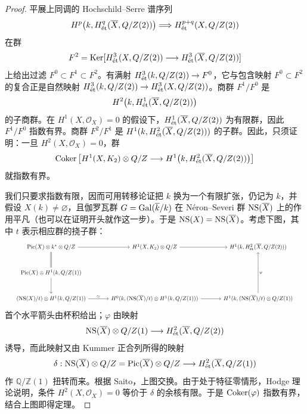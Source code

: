 \begin{proof}
平展上同调的 Hochschild--Serre 谱序列
\[
 H^p\bigl(k,H^q_{\mathrm{\acute et}}(\overline X,Q/Z(2))\bigr)
 \Longrightarrow H^{p+q}_{\mathrm{\acute et}}(X,Q/Z(2))
\]
在群
\[
 F^2=\operatorname{Ker}[H^3_{\mathrm{\acute et}}(X,Q/Z(2))
 \longrightarrow H^3_{\mathrm{\acute et}}(\overline X,Q/Z(2))]
\]
上给出过滤 $F^0\subset F^1\subset F^2$。有满射 $H^3_{\mathrm{\acute et}}(k,Q/Z(2))\to F^0$，它与包含映射 $F^0\subset F^2$ 的复合正是自然映射 $H^3_{\mathrm{\acute et}}(k,Q/Z(2))\to H^3_{\mathrm{\acute et}}(X,Q/Z(2))$。商群 $F^1/F^0$ 是
\[
 H^2\bigl(k,H^1_{\mathrm{\acute et}}(\overline X,Q/Z(2))\bigr)
\]
的子商群。在 $H^1(X,\mathcal O_X)=0$ 的假设下，$H^1_{\mathrm{\acute et}}(\overline X,Q/Z(2))$ 为有限群，因此 $F^1/F^0$ 指数有界。商群 $F^2/F^1$ 是 $H^1(k,H^2_{\mathrm{\acute et}}(\overline X,Q/Z(2)))$ 的子群。因此，只须证明：一旦 $H^2(X,\mathcal O_X)=0$，群
\[
 \operatorname{Coker}\left[H^1(X,K_2)\otimes Q/Z
 \longrightarrow H^1\bigl(k,H^2_{\mathrm{\acute et}}(\overline X,Q/Z(2))\bigr)\right]
\]
就指数有界。

我们只要求指数有限，因而可用转移论证把 $k$ 换为一个有限扩张，仍记为 $k$，并假设 $X(k)\ne\varnothing$，且伽罗瓦群 $G=\operatorname{Gal}(\overline k/k)$ 在 Néron--Severi 群 $\operatorname{NS}(\overline X)$ 上的作用平凡（也可以在证明开头就作这一步）。于是 $\operatorname{NS}(X)=\operatorname{NS}(\overline X)$。考虑下图，其中 $t$ 表示相应群的挠子群：
\[
\resizebox{.98\linewidth}{!}{$
\begin{tikzcd}[ampersand replacement=\&,column sep=large,row sep=large]
 \Pic(X)\otimes k^*\otimes\mathbb Q/\mathbb Z\arrow[r]\arrow[d,equal]
 \&H^1(X,\mathcal K_2)\otimes\mathbb Q/\mathbb Z\arrow[r]
 \&H^1(k,H^2_{\et}(\overline X,\mathbb Q/\mathbb Z(2)))\\
 \Pic(X)\otimes H^1(k,\mathbb Q/\mathbb Z(1))\arrow[d]\&\&\\
 (\NS(X)/t)\otimes H^1(k,\mathbb Q/\mathbb Z(1))\arrow[r,"{\simeq}"]
 \&H^0(k,(\NS(\overline X)/t)\otimes H^1(k,\mathbb Q/\mathbb Z(1)))\arrow[r]
 \&H^1(k,(\NS(\overline X)/t)\otimes\mathbb Q/\mathbb Z(1))\arrow[uu,"{\varphi}"']
\end{tikzcd}$}
\]
首个水平箭头由杯积给出；$\varphi$ 由映射
\[
 \operatorname{NS}(\overline X)\otimes Q/Z(1)
 \longrightarrow H^2_{\mathrm{\acute et}}(\overline X,Q/Z(2))
\]
诱导，而此映射又由 Kummer 正合列所得的映射
\[
 \delta:\operatorname{NS}(\overline X)\otimes Q/Z
 =\operatorname{Pic}(\overline X)\otimes Q/Z
 \longrightarrow H^2_{\mathrm{\acute et}}(\overline X,Q/Z(1))
\]
作 $\mathbb Q/\mathbb Z(1)$ 扭转而来。根据 Saito，上图交换。由于处于特征零情形，Hodge 理论说明，条件 $H^2(X,\mathcal O_X)=0$ 等价于 $\delta$ 的余核有限。于是 $\operatorname{Coker}(\varphi)$ 指数有界，结合上图即得定理。
\end{proof}

